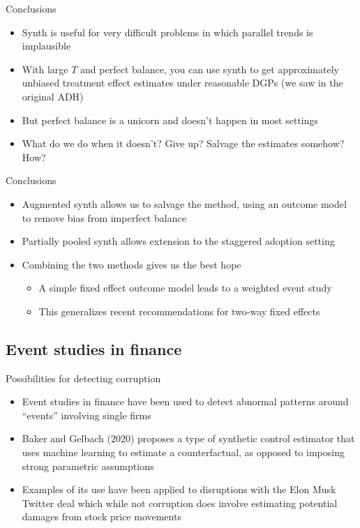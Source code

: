\documentclass{beamer}
\begin{document}
\begin{frame}{Conclusions}

\begin{itemize}
\item Synth is useful for very difficult problems in which parallel trends is implausible
\item With large $T$ and perfect balance, you can use synth to get approximately unbiased treatment effect estimates under reasonable DGPs (we saw in the original ADH)
\item But perfect balance is a unicorn and doesn't happen in most settings
\item What do we do when it doesn't?  Give up?  Salvage the estimates somehow? How?
\end{itemize}

\end{frame}


\begin{frame}{Conclusions}

\begin{itemize}
\item Augmented synth allows us to salvage the method, using an outcome model to remove bias from imperfect balance
\item Partially pooled synth allows extension to the staggered adoption setting
\item Combining the two methods gives us the best hope 
	\begin{itemize}
	\item A simple fixed effect outcome model leads to a weighted event study
	\item This generalizes recent recommendations for two-way fixed effects
	\end{itemize}
\end{itemize}

\end{frame}





\subsection{Event studies in finance}

\begin{frame}{Possibilities for detecting corruption}

\begin{itemize}

\item Event studies in finance have been used to detect abnormal patterns around ``events'' involving single firms
\item Baker and Gelbach (2020) proposes a type of synthetic control estimator that uses machine learning to estimate a counterfactual, as opposed to imposing strong parametric assumptions
\item Examples of its use have been applied to disruptions with the Elon Musk Twitter deal which while not corruption does involve estimating potential damages from stock price movements

\end{itemize}

\end{frame}
\end{document}
